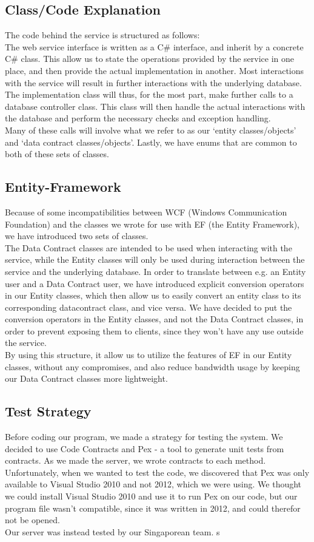 \documentclass[10pt,a4paper]{article}
\begin{document}
\subsection{Class/Code Explanation}
The code behind the service is structured as follows:\\
The web service interface is written as a C\# interface, and inherit by a concrete C\# class. This allow us to state the operations provided by the service in one place, and then provide the actual implementation in another. Most interactions with the service will result in further interactions with the underlying database. The implementation class will thus, for the most part, make further calls to a database controller class. This class will then handle the actual interactions with the database and perform the necessary checks and exception handling.\\
Many of these calls will involve what we refer to as our ‘entity classes/objects’ and ‘data contract classes/objects’. Lastly, we have enums that are common to both of these sets of classes.

\subsection{Entity-Framework}
Because of some incompatibilities between WCF (Windows Communication Foundation) and the classes we wrote for use with EF (the Entity Framework), we have introduced two sets of classes.\\
The Data Contract classes are intended to be used when interacting with the service, while the  Entity classes will only be used during interaction between the service and the underlying database. In order to translate between e.g. an Entity user and a Data Contract user, we have introduced explicit conversion operators in our Entity classes, which then allow us to easily convert an entity class to its corresponding datacontract class, and vice versa. We have decided to put the conversion operators in the Entity classes, and not the Data Contract classes, in order to prevent exposing them to clients, since they won't have any use outside the service. \\
By using this structure, it allow us to utilize the features of EF in our Entity classes, without any compromises, and also reduce bandwidth usage by keeping our Data Contract classes more lightweight.

\subsection{Test Strategy}
Before coding our program, we made a strategy for testing the system. We decided to use Code Contracts and Pex - a tool to generate unit tests from contracts. As we made the server, we wrote contracts to each method. Unfortunately, when we wanted to test the code, we discovered that Pex was only available to Visual Studio 2010 and not 2012, which we were using.  We thought we could install Visual Studio 2010 and use it to run Pex on our code, but our program file wasn't compatible, since it was written in 2012, and could therefor not be opened. \\
Our server was instead tested by our Singaporean team. s
 
\end{document}
